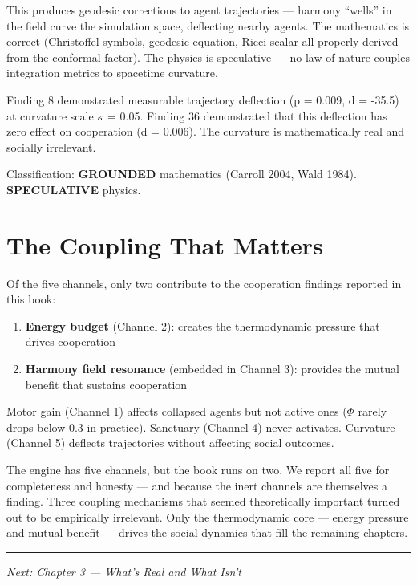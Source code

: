 This produces geodesic corrections to agent trajectories --- harmony ``wells'' in the field curve the simulation space, deflecting nearby agents. The mathematics is correct (Christoffel symbols, geodesic equation, Ricci scalar all properly derived from the conformal factor). The physics is speculative --- no law of nature couples integration metrics to spacetime curvature.

Finding 8 demonstrated measurable trajectory deflection (p = 0.009, d = -35.5) at curvature scale $\kappa$ = 0.05. Finding 36 demonstrated that this deflection has zero effect on cooperation (d = 0.006). The curvature is mathematically real and socially irrelevant.

Classification: \textbf{GROUNDED} mathematics (Carroll 2004, Wald 1984). \textbf{SPECULATIVE} physics.

\section{The Coupling That Matters}\label{the-coupling-that-matters}

Of the five channels, only two contribute to the cooperation findings reported in this book:

\begin{enumerate}
\def\labelenumi{\arabic{enumi}.}
\tightlist
\item
  \textbf{Energy budget} (Channel 2): creates the thermodynamic pressure that drives cooperation
\item
  \textbf{Harmony field resonance} (embedded in Channel 3): provides the mutual benefit that sustains cooperation
\end{enumerate}

Motor gain (Channel 1) affects collapsed agents but not active ones ($\Phi$ rarely drops below 0.3 in practice). Sanctuary (Channel 4) never activates. Curvature (Channel 5) deflects trajectories without affecting social outcomes.

The engine has five channels, but the book runs on two. We report all five for completeness and honesty --- and because the inert channels are themselves a finding. Three coupling mechanisms that seemed theoretically important turned out to be empirically irrelevant. Only the thermodynamic core --- energy pressure and mutual benefit --- drives the social dynamics that fill the remaining chapters.

\begin{center}\rule{0.5\linewidth}{0.5pt}\end{center}

\emph{Next: Chapter 3 --- What's Real and What Isn't}
